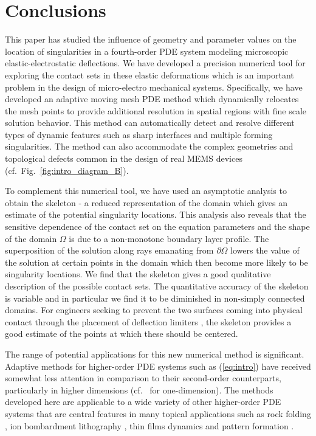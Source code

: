 \documentclass{siamart0516}
\renewcommand{\eqref}[1]{(\ref{#1})}
\theoremstyle{plain}%
\theoremstyle{definition}
\theoremstyle{remark}
\begin{document}
\section{Conclusions}\label{sec:discussion}

This paper has studied the influence of geometry and parameter values on the location of singularities in a fourth-order PDE system modeling microscopic elastic-electrostatic deflections. We have developed a precision numerical tool for exploring the contact sets in these elastic deformations which is an important problem in the design of micro-electro mechanical systems. Specifically, we have developed an adaptive moving mesh PDE method which dynamically relocates the mesh points to provide additional resolution in spatial regions with fine scale solution behavior. This method can automatically detect and resolve different types of dynamic features such as sharp interfaces and multiple forming singularities. The method can also accommodate the complex geometries and topological defects common in the design of real MEMS devices (cf.~Fig.~\ref{fig:intro_diagram_B}).

To complement this numerical tool, we have used an asymptotic analysis to obtain the skeleton - a reduced representation of the domain which gives an estimate of the potential singularity locations. This analysis also reveals that the sensitive dependence of the contact set on the equation parameters and the shape of the domain $\Omega$ is due to a non-monotone boundary layer profile. The superposition of the solution along rays emanating from $\partial\Omega$ lowers the value of the solution at certain points in the domain which then become more likely to be singularity locations. We find that the skeleton gives a good qualitative description of the possible contact sets. The quantitative accuracy of the skeleton is variable and in particular we find it to be diminished in non-simply connected domains. For engineers seeking to prevent the two surfaces coming into physical contact through the placement of deflection limiters \cite{Krylov2010}, the skeleton provides a good estimate of the points at which these should be centered.

The range of potential applications for this new numerical method is significant. Adaptive methods for higher-order PDE systems such as \eqref{eq:intro} have received somewhat less attention in comparison to their second-order counterparts, particularly in higher dimensions (cf.~\cite{MovCol42007} for one-dimension). The methods developed here are applicable to a wide variety of other higher-order PDE systems that are central features in many topical applications such as rock folding \cite{Dodwell2012a}, ion bombardment lithography \cite{Perkinson2016}, thin films dynamics \cite{LBGK2007,Witelski2017} and pattern formation \cite{LG2013,Gavish2011,Dai2014}.
\end{document}
